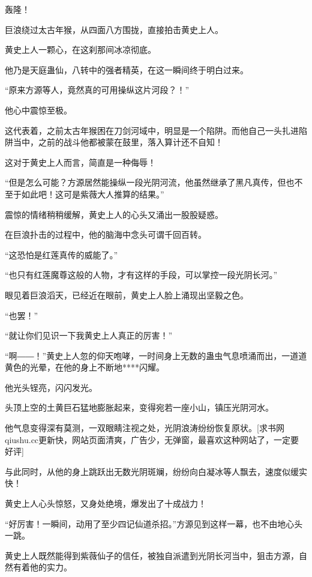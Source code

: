 
\begin{this_body}

轰隆！

巨浪绕过太古年猴，从四面八方围拢，直接拍击黄史上人。

黄史上人一颗心，在这刹那间冰凉彻底。

他乃是天庭蛊仙，八转中的强者精英，在这一瞬间终于明白过来。

“原来方源等人，竟然真的可用操纵这片河段？！”

他心中震惊至极。

这代表着，之前太古年猴困在刀剑河域中，明显是一个陷阱。而他自己一头扎进陷阱当中，之前的战斗他都被蒙在鼓里，落入算计还不自知！

这对于黄史上人而言，简直是一种侮辱！

“但是怎么可能？方源居然能操纵一段光阴河流，他虽然继承了黑凡真传，但也不至于如此吧！这可是紫薇大人推算的结果。”

震惊的情绪稍稍缓解，黄史上人的心头又涌出一股股疑惑。

在巨浪扑击的过程中，他的脑海中念头可谓千回百转。

“这恐怕是红莲真传的威能了。”

“也只有红莲魔尊这般的人物，才有这样的手段，可以掌控一段光阴长河。”

眼见着巨浪滔天，已经近在眼前，黄史上人脸上涌现出坚毅之色。

“也罢！”

“就让你们见识一下我黄史上人真正的厉害！”

“啊――！”黄史上人忽的仰天咆哮，一时间身上无数的蛊虫气息喷涌而出，一道道黄色的光晕，在他的身上不断地****闪耀。

他光头锃亮，闪闪发光。

头顶上空的土黄巨石猛地膨胀起来，变得宛若一座小山，镇压光阴河水。

他气息变得深有莫测，一双眼睛注视之处，光阴浪涛纷纷恢复原状。[求书网qiushu.cc更新快，网站页面清爽，广告少，无弹窗，最喜欢这种网站了，一定要好评]

与此同时，从他的身上跳跃出无数光阴斑斓，纷纷向白凝冰等人飘去，速度似缓实快！

黄史上人心头惊怒，又身处绝境，爆发出了十成战力！

“好厉害！一瞬间，动用了至少四记仙道杀招。”方源见到这样一幕，也不由地心头一跳。

黄史上人既然能得到紫薇仙子的信任，被独自派遣到光阴长河当中，狙击方源，自然有着他的实力。


\end{this_body}
